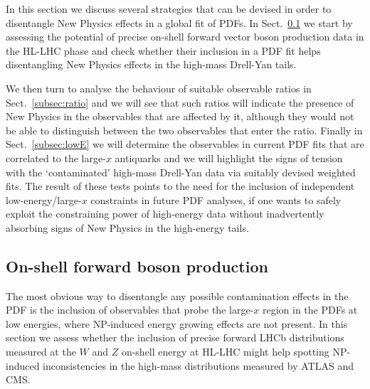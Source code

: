 \documentclass[withindex,glossary]{cam-thesis}
\begin{document}
In this section we discuss several strategies that can be devised in order to disentangle 
New Physics effects in a global fit of PDFs. In Sect.~\ref{subsec:forward} we start by 
assessing the potential of precise on-shell forward vector boson production 
data in the HL-LHC phase and check whether their inclusion in a PDF fit helps disentangling 
New Physics effects in the high-mass Drell-Yan tails. 

We then turn to analyse the behaviour of suitable observable ratios in Sect.~\ref{subsec:ratio} and we will see that such ratios will indicate the 
presence of New Physics in the observables that are affected by it, although they would not be able to distinguish between the two observables that 
enter the ratio. Finally in Sect.~\ref{subsec:lowE} we will determine the  observables in current PDF fits that are correlated to the 
large-$x$ antiquarks and we will highlight the signs of tension with the `contaminated' high-mass Drell-Yan data via suitably devised weighted fits. 
The result of these tests points to the need for the inclusion of independent low-energy/large-$x$ constraints in future PDF analyses, 
if one wants to safely exploit the constraining power of high-energy data without inadvertently absorbing signs of New Physics 
in the high-energy tails. 


\subsection{On-shell forward boson production}
\label{subsec:forward}
The most obvious way to disentangle any possible contamination effects in the PDF is the inclusion 
of observables that probe the large-$x$ region in the PDFs at low energies, where NP-induced energy growing effects are not present.  
In this section we assess whether the inclusion of precise forward LHCb distributions measured at the $W$ and $Z$ on-shell energy 
at HL-LHC might help spotting NP-induced inconsistencies in the high-mass distributions measured by ATLAS and CMS. 
\end{document}
